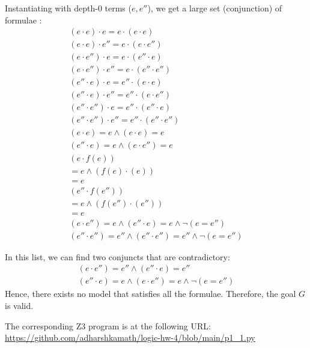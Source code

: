 \documentclass[12pt,letterpaper, onecolumn]{exam}
\newcommand{\link}[1]{{\color{blue}\href{#1}{#1}}}
\begin{document}
\begin{questions}
	Instantiating with depth-0 terms ($e, e''$), we get a large set (conjunction) of formulae :
	\begin{align*}
		(e \cdot e) \cdot e = e \cdot (e \cdot e) \\
		(e \cdot e) \cdot e'' = e \cdot (e \cdot e'') \\
		(e \cdot e'') \cdot e = e \cdot (e'' \cdot e) \\
		(e \cdot e'') \cdot e'' = e \cdot (e'' \cdot e'') \\
		(e'' \cdot e) \cdot e = e'' \cdot (e \cdot e) \\
		(e'' \cdot e) \cdot e'' = e'' \cdot (e \cdot e'') \\
		(e'' \cdot e'') \cdot e = e'' \cdot (e'' \cdot e) \\
		(e'' \cdot e'') \cdot e'' = e'' \cdot (e'' \cdot e'') \\
		(e \cdot e) = e \land (e \cdot e) = e \\
		(e'' \cdot e) = e \land (e \cdot e'') = e \\
		(e \cdot f(e))  \\ = e \land (f(e) \cdot (e))  \\ = e \\
		(e'' \cdot f(e''))  \\ = e \land (f(e'') \cdot (e''))  \\ = e \\
		(e \cdot e'') = e \land (e'' \cdot e) = e \land \neg (e = e'') \\
		(e'' \cdot e'') = e'' \land (e'' \cdot e'') = e'' \land \neg (e = e'')
	\end{align*}
	
	In this list,
	we can find two conjuncts that are contradictory:
	\begin{align*}
		(e \cdot e'') = e'' \land (e'' \cdot e) = e'' \\
		(e'' \cdot e) = e \land (e \cdot e'') = e \land \neg (e = e'')
	\end{align*}
	Hence, there exists no model that satisfies all the formulae.
	Therefore, the goal $G$ is valid.

	The corresponding Z3 program is at the following URL:
	\link{https://github.com/adharshkamath/logic-hw-4/blob/main/p1\_1.py} \\
	


\end{questions}
\end{document}
